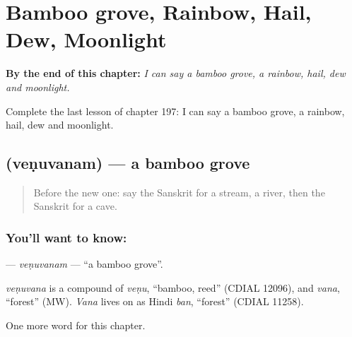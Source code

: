 
\chapter{Bamboo grove, Rainbow, Hail, Dew, Moonlight}
\label{ch:sa-bamboo-grove-rainbow-hail-dew-moonlight}

\begin{chapteropening}
\textbf{By the end of this chapter:} \emph{I can say a bamboo grove, a rainbow, hail, dew and moonlight.}

Complete the last lesson of chapter 197: I can say a bamboo grove, a rainbow, hail, dew and moonlight.
\end{chapteropening}

\section[\texorpdfstring{\sk{वेणुवनम्} (veṇuvanam)}{वेणुवनम् (veṇuvanam)}]{ (veṇuvanam) — a bamboo grove}

\label{lesson:SA-C197-venuvanam}



\begin{quote}
Before the new one: say the Sanskrit for a stream, a river, then the Sanskrit for a cave.
\end{quote}

\subsection*{You'll want to know: }
\textbf{} — \emph{veṇuvanam} — \textquotedblleft{}a bamboo grove\textquotedblright{}.

\begin{cousinweb}
\emph{veṇuvana} is a compound of \emph{veṇu}, \textquotedblleft{}bamboo, reed\textquotedblright{} (CDIAL 12096), and \emph{vana}, \textquotedblleft{}forest\textquotedblright{} (MW). \emph{Vana} lives on as Hindi \emph{ban}, \textquotedblleft{}forest\textquotedblright{} (CDIAL 11258).
\end{cousinweb}

\begin{grammarlens}[title={What you've built}]
One more word for this chapter.
\end{grammarlens}

